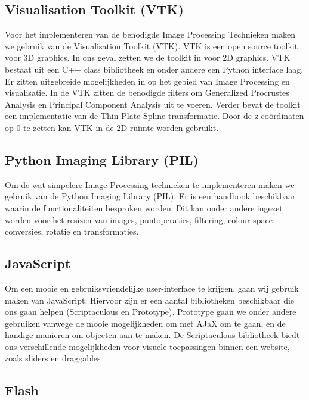 \subsection{Visualisation Toolkit (VTK)}
Voor het implementeren van de benodigde Image Processing Technieken maken we gebruik van de Visualisation Toolkit (VTK)\cite{vtk}. 
VTK is een open source toolkit voor 3D graphics. 
In ons geval zetten we de toolkit in voor 2D graphics. 
VTK bestaat uit een C++ class bibliotheek en onder andere een Python interface laag.\cite{vtk2} 
Er zitten uitgebreide mogelijkheden in op het gebied van Image Processing en visualisatie.
In de VTK zitten de benodigde filters om Generalized Procrustes Analysis en Principal Component Analysis uit te voeren. 
Verder bevat de toolkit een implementatie van de Thin Plate Spline transformatie. 
Door de z-co\"{o}rdinaten op 0 te zetten kan VTK in de 2D ruimte worden gebruikt. 

\subsection{Python Imaging Library (PIL)}
Om de wat simpelere Image Processing technieken te implementeren maken we gebruik van de Python Imaging Library (PIL)\cite{pil}. 
Er is een handbook beschikbaar waarin de functionaliteiten besproken worden.\cite{pilhandbook} 
Dit kan onder andere ingezet worden voor het resizen van images, puntoperaties, filtering, colour space conversies, rotatie en transformaties. 

\subsection{JavaScript}
Om een mooie en gebruiksvriendelijke user-interface te krijgen, gaan wij gebruik maken van JavaScript.
Hiervoor zijn er een aantal bibliotheken beschikbaar die ons gaan helpen (Scriptaculous\cite{scriptaculous} en Prototype\cite{prototype}).
Prototype gaan we onder andere gebruiken vanwege de mooie mogelijkheden om met AJaX om te gaan, en de handige manieren om objecten aan te maken.
De Scriptaculous bibliotheek biedt ons verschillende mogelijkheden voor visuele toepassingen binnen een website, zoals sliders en draggables

\subsection{Flash}
